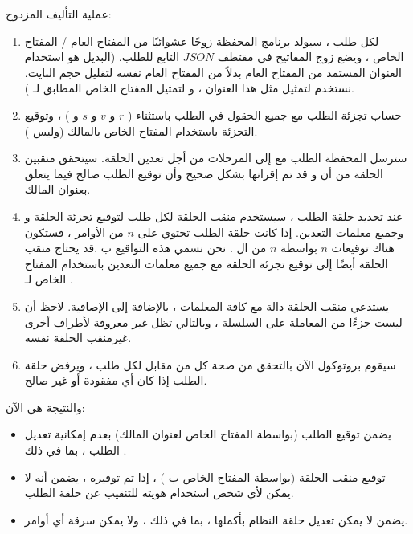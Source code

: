 \documentclass[12pt, a4paper, leqno]{report}
\theoremstyle{plain}
\theoremstyle{definition}
\begin{document}
\begin{multicols}{2}
\begin{otherlanguage}{arabic}
عملية التأليف المزدوج:
\begin{enumerate}
	\item لكل طلب ، سيولد برنامج المحفظة زوجًا عشوائيًا من المفتاح العام / المفتاح الخاص ، ويضع زوج المفاتيح في مقتطف $JSON$ التابع للطلب. (البديل هو استخدام العنوان المستمد من المفتاح العام بدلاً من المفتاح العام نفسه لتقليل حجم البايت. نستخدم  لتمثيل مثل هذا العنوان ، و  لتمثيل المفتاح الخاص المطابق لـ ).
	\item حساب تجزئة الطلب مع جميع الحقول في الطلب باستثناء ( $r$ و $v$ و $s$ و ) ، وتوقيع التجزئة باستخدام المفتاح الخاص بالمالك (وليس ).
	\item سترسل المحفظة الطلب مع  إلى المرحلات من أجل تعدين الحلقة. سيتحقق منقبين الحلقة من أن  و   قد تم إقرانها بشكل صحيح وأن توقيع الطلب صالح فيما يتعلق بعنوان المالك.
	\item عند تحديد حلقة الطلب ، سيستخدم منقب الحلقة    لكل طلب لتوقيع تجزئة الحلقة و  وجميع معلمات التعدين. إذا كانت حلقة الطلب تحتوي على $n$ من الأوامر ، فستكون هناك توقيعات $n$  بواسطة $n$  من ال   . نحن نسمي هذه التواقيع ب   .قد يحتاج منقب الحلقة أيضًا إلى توقيع تجزئة الحلقة مع جميع معلمات التعدين باستخدام المفتاح الخاص لـ .
	\item يستدعي منقب الحلقة دالة  مع كافة المعلمات ، بالإضافة إلى  الإضافية. لاحظ أن   ليست جزءًا من المعاملة على السلسلة ، وبالتالي تظل غير معروفة لأطراف أخرى غيرمنقب الحلقة نفسه.
	\item سيقوم بروتوكول   الآن بالتحقق من صحة كل من   مقابل  لكل   طلب ، ويرفض حلقة الطلب إذا كان أي  مفقودة أو غير صالح.
\end{enumerate}

والنتيجة هي الآن:
\begin{itemize}
	\item يضمن توقيع الطلب (بواسطة المفتاح الخاص لعنوان المالك) بعدم إمكانية تعديل الطلب ، بما في ذلك .
	\item توقيع منقب الحلقة (بواسطة المفتاح الخاص ب  ) ، إذا تم توفيره ، يضمن أنه لا يمكن لأي شخص استخدام هويته للتنقيب عن حلقة الطلب.
	\item يضمن   لا يمكن تعديل حلقة النظام بأكملها ، بما في ذلك ، ولا يمكن سرقة أي أوامر.
\end{itemize}


\end{otherlanguage}
\end{multicols}
\end{document}
